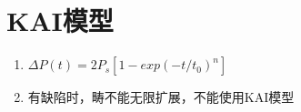 \section{KAI模型}
\begin{enumerate}
	\item $\Delta P(t) = 2P_s[1-exp{(-t/t_0)^n}]$
	\item 有缺陷时，畴不能无限扩展，不能使用KAI模型
\end{enumerate}